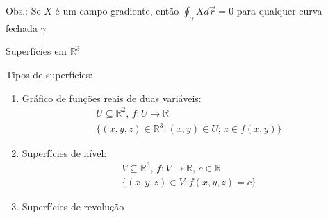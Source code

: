 \begin{center}
\end{center}

\null\hspace{48pt}Obs.: Se $X$ é um campo gradiente, então $\displaystyle\oint_\gamma X d\vec{r}=0$ para qualquer curva fechada $\gamma$\\	

\newpage
\begin{center}		
		\begin{Large}
			Superfícies em $\mathbb{R}^3$
		\end{Large}
	\end{center}

\begin{large}
	Tipos de superfícies:
\end{large}
\begin{enumerate}
\item Gráfico de funções reais de duas variáveis:
\begin{gather*}
U \subseteq \mathbb{R}^2 \text{, } f:U\to\mathbb{R} \\
\{ (x,y,z) \in \mathbb{R}^3: (x,y) \in U \text{; } z \in f(x,y) \}
\end{gather*}
\item Superfícies de nível:
\begin{gather*}
V \subseteq \mathbb{R}^3 \text{, } f:V\to\mathbb{R}\text{, } c \in \mathbb{R} \\
\{ (x,y,z) \in V: f(x,y,z)=c \}
\end{gather*}
\item Superfícies de revolução
\end{enumerate}

